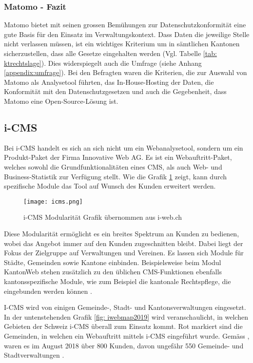 \subsubsection{Matomo - Fazit}

Matomo bietet mit seinen grossen Bemühungen zur Datenschutzkonformität eine gute Basis für den Einsatz im Verwaltungskontext. Dass Daten die jeweilige Stelle nicht verlassen müssen, ist ein wichtiges Kriterium um in sämtlichen Kantonen sicherzustellen, dass alle Gesetze eingehalten werden (Vgl. Tabelle \ref{tab: ktrechtslage}). Dies widerspiegelt auch die Umfrage (siehe Anhang \ref{appendix:umfrage}). Bei den Befragten waren die Kriterien, die zur Auswahl von Matomo als Analysetool führten, das In-House-Hosting der Daten, die Konformität mit den Datenschutzgesetzen und auch die Gegebenheit, dass Matomo eine Open-Source-Lösung ist.  

\newpage

\subsection{i-CMS} \label{subsec:icmsmarkt}
Bei i-CMS handelt es sich an sich nicht um ein Webanalysetool, sondern um ein Produkt-Paket der Firma Innovative Web AG. Es ist ein Webauftritt-Paket, welches sowohl die Grundfunktionalitäten eines CMS, als auch Web- und Business-Statistik zur Verfügung stellt\parencite{iwebwebsiteCMS}. Wie die Grafik \ref{fig: icms} zeigt, kann durch spezifische Module das Tool auf Wunsch des Kunden erweitert werden.


\begin{figure}[h]
  \centering
  \texttt{[image: icms.png]}
  \caption{i-CMS Modularität Grafik übernommen aus i-web.ch \parencite{iweb2019revue}}
  \label{fig: icms}
\end{figure}

Diese Modularität ermöglicht es ein breites Spektrum an Kunden zu bedienen, wobei das Angebot immer auf den Kunden zugeschnitten bleibt. Dabei liegt der Fokus der Zielgruppe auf Verwaltungen und Vereinen. Es lassen sich Module für Städte, Gemeinden sowie Kantone einbinden. Beispielsweise beim Modul KantonWeb stehen zusätzlich zu den üblichen CMS-Funktionen ebenfalls kantonsspezifische Module, wie zum Beispiel die kantonale Rechtspflege, die eingebunden werden können \parencite{iwebwebsiteKanotonWeb}.

I-CMS wird von einigen Gemeinde-, Stadt- und Kantonsverwaltungen eingesetzt. In der untenstehenden Grafik \ref{fig: iwebmap2019} wird veranschaulicht, in welchen Gebieten der Schweiz i-CMS überall zum Einsatz kommt. Rot markiert sind die Gemeinden, in welchen ein Webauftritt mittels i-CMS eingeführt wurde. Gemäss \parencite[S. 14]{iweb2018revue}, waren es im August 2018 über 800 Kunden, davon ungefähr 550 Gemeinde- und Stadtverwaltungen \parencite{iwebwebsiteGemeindeWeb}.

